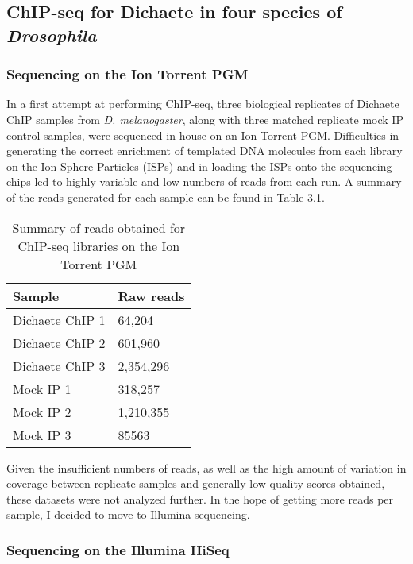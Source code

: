 \subsection{ChIP-seq for Dichaete in four species of \emph{Drosophila}}
\subsubsection{Sequencing on the Ion Torrent PGM}
In a first attempt at performing ChIP-seq, three biological replicates of Dichaete ChIP samples from \emph{D. melanogaster}, along with three matched replicate mock IP control samples, were sequenced in-house on an Ion Torrent PGM. Difficulties in generating the correct enrichment of templated DNA molecules from each library on the Ion Sphere Particles (ISPs) and in loading the ISPs onto the sequencing chips led to highly variable and low numbers of reads from each run. A summary of the reads generated for each sample can be found in Table 3.1.
 
\begin{table}[h]
\centering
\begin{tabular}{|l|l|}
\hline
\textbf{Sample}          & \textbf{Raw reads} \\ \hline
Dichaete ChIP 1 & 64,204    \\ \hline
Dichaete ChIP 2 & 601,960   \\ \hline
Dichaete ChIP 3 & 2,354,296 \\ \hline
Mock IP 1       & 318,257   \\ \hline
Mock IP 2       & 1,210,355 \\ \hline
Mock IP 3       & 85563    \\ \hline
\end{tabular}
\caption{Summary of reads obtained for ChIP-seq libraries on the Ion Torrent PGM}
\label{Table 3.1}
\end{table}

Given the insufficient numbers of reads, as well as the high amount of variation in coverage between replicate samples and generally low quality scores obtained, these datasets were not analyzed further. In the hope of getting more reads per sample, I decided to move to Illumina sequencing.

\subsubsection{Sequencing on the Illumina HiSeq}

